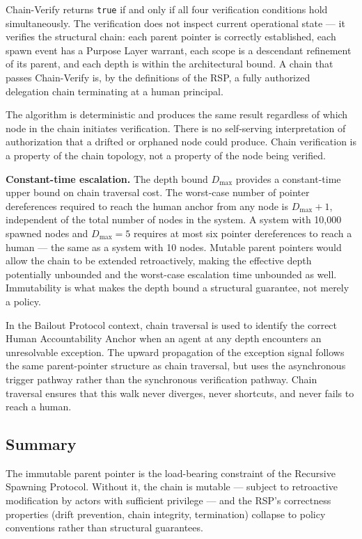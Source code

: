 Chain-Verify returns \texttt{true} if and only if all four verification conditions hold simultaneously. The verification does not inspect current operational state — it verifies the structural chain: each parent pointer is correctly established, each spawn event has a Purpose Layer warrant, each scope is a descendant refinement of its parent, and each depth is within the architectural bound. A chain that passes Chain-Verify is, by the definitions of the RSP, a fully authorized delegation chain terminating at a human principal.

The algorithm is deterministic and produces the same result regardless of which node in the chain initiates verification. There is no self-serving interpretation of authorization that a drifted or orphaned node could produce. Chain verification is a property of the chain topology, not a property of the node being verified.

\medskip
\noindent\textbf{Constant-time escalation.} The depth bound $D_{\max}$ provides a constant-time upper bound on chain traversal cost. The worst-case number of pointer dereferences required to reach the human anchor from any node is $D_{\max} + 1$, independent of the total number of nodes in the system. A system with 10,000 spawned nodes and $D_{\max} = 5$ requires at most six pointer dereferences to reach a human — the same as a system with 10 nodes. Mutable parent pointers would allow the chain to be extended retroactively, making the effective depth potentially unbounded and the worst-case escalation time unbounded as well. Immutability is what makes the depth bound a structural guarantee, not merely a policy.

In the Bailout Protocol context, chain traversal is used to identify the correct Human Accountability Anchor when an agent at any depth encounters an unresolvable exception. The upward propagation of the exception signal follows the same parent-pointer structure as chain traversal, but uses the asynchronous trigger pathway rather than the synchronous verification pathway. Chain traversal ensures that this walk never diverges, never shortcuts, and never fails to reach a human.

\subsection{Summary}
\label{sec:immutability-summary}

The immutable parent pointer is the load-bearing constraint of the Recursive Spawning Protocol. Without it, the chain is mutable — subject to retroactive modification by actors with sufficient privilege — and the RSP's correctness properties (drift prevention, chain integrity, termination) collapse to policy conventions rather than structural guarantees.

